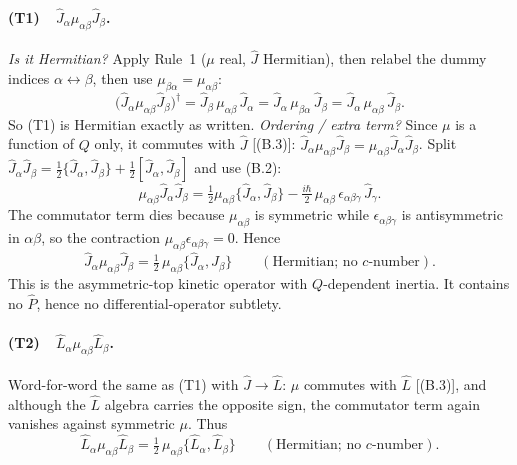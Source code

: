 \paragraph{(T1)\ \ $\hat J_\alpha\mu_{\alpha\beta}\hat J_\beta$.}
\emph{Is it Hermitian?} Apply Rule~1 ($\mu$ real, $\hat J$ Hermitian), then relabel the dummy indices $\alpha\leftrightarrow\beta$, then use $\mu_{\beta\alpha}=\mu_{\alpha\beta}$:
\begin{equation*}
\bigl(\hat J_\alpha\mu_{\alpha\beta}\hat J_\beta\bigr)^{\dagger}
=\hat J_\beta\,\mu_{\alpha\beta}\,\hat J_\alpha
=\hat J_\alpha\,\mu_{\beta\alpha}\,\hat J_\beta
=\hat J_\alpha\,\mu_{\alpha\beta}\,\hat J_\beta .
\end{equation*}
So (T1) is Hermitian exactly as written. \emph{Ordering / extra term?} Since $\mu$ is a function of $Q$ only, it commutes with $\hat J$ [(B.3)]: $\hat J_\alpha\mu_{\alpha\beta}\hat J_\beta=\mu_{\alpha\beta}\hat J_\alpha\hat J_\beta$. Split $\hat J_\alpha\hat J_\beta=\tfrac12\{\hat J_\alpha,\hat J_\beta\}+\tfrac12[\hat J_\alpha,\hat J_\beta]$ and use (B.2):
\begin{equation*}
\mu_{\alpha\beta}\hat J_\alpha\hat J_\beta
=\tfrac12\mu_{\alpha\beta}\{\hat J_\alpha,\hat J_\beta\}
-\tfrac{i\hbar}{2}\,\mu_{\alpha\beta}\,\epsilon_{\alpha\beta\gamma}\,\hat J_\gamma .
\end{equation*}
The commutator term dies because $\mu_{\alpha\beta}$ is symmetric while $\epsilon_{\alpha\beta\gamma}$ is antisymmetric in $\alpha\beta$, so the contraction $\mu_{\alpha\beta}\epsilon_{\alpha\beta\gamma}=0$. Hence
\begin{equation}
\hat J_\alpha\mu_{\alpha\beta}\hat J_\beta=\tfrac12\,\mu_{\alpha\beta}\{\hat J_\alpha,\hat J_\beta\}
\qquad(\text{Hermitian; no }c\text{-number}). \tag{B.8}
\end{equation}
This is the asymmetric-top kinetic operator with $Q$-dependent inertia. It contains no $\hat P$, hence no differential-operator subtlety.

\paragraph{(T2)\ \ $\hat L_\alpha\mu_{\alpha\beta}\hat L_\beta$.}
Word-for-word the same as (T1) with $\hat J\to\hat L$: $\mu$ commutes with $\hat L$ [(B.3)], and although the $\hat L$ algebra carries the opposite sign, the commutator term again vanishes against symmetric $\mu$. Thus
\begin{equation}
\hat L_\alpha\mu_{\alpha\beta}\hat L_\beta=\tfrac12\,\mu_{\alpha\beta}\{\hat L_\alpha,\hat L_\beta\}
\qquad(\text{Hermitian; no }c\text{-number}). \tag{B.9}
\end{equation}

